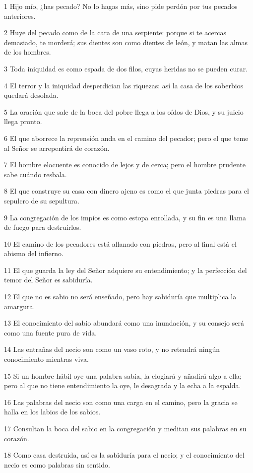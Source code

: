 \par 1 Hijo mío, ¿has pecado? No lo hagas más, sino pide perdón por tus pecados anteriores.
\par 2 Huye del pecado como de la cara de una serpiente: porque si te acercas demasiado, te morderá; sus dientes son como dientes de león, y matan las almas de los hombres.
\par 3 Toda iniquidad es como espada de dos filos, cuyas heridas no se pueden curar.
\par 4 El terror y la iniquidad desperdician las riquezas: así la casa de los soberbios quedará desolada.
\par 5 La oración que sale de la boca del pobre llega a los oídos de Dios, y su juicio llega pronto.
\par 6 El que aborrece la reprensión anda en el camino del pecador; pero el que teme al Señor se arrepentirá de corazón.
\par 7 El hombre elocuente es conocido de lejos y de cerca; pero el hombre prudente sabe cuándo resbala.
\par 8 El que construye su casa con dinero ajeno es como el que junta piedras para el sepulcro de su sepultura.
\par 9 La congregación de los impíos es como estopa enrollada, y su fin es una llama de fuego para destruirlos.
\par 10 El camino de los pecadores está allanado con piedras, pero al final está el abismo del infierno.
\par 11 El que guarda la ley del Señor adquiere su entendimiento; y la perfección del temor del Señor es sabiduría.
\par 12 El que no es sabio no será enseñado, pero hay sabiduría que multiplica la amargura.
\par 13 El conocimiento del sabio abundará como una inundación, y su consejo será como una fuente pura de vida.
\par 14 Las entrañas del necio son como un vaso roto, y no retendrá ningún conocimiento mientras viva.
\par 15 Si un hombre hábil oye una palabra sabia, la elogiará y añadirá algo a ella; pero al que no tiene entendimiento la oye, le desagrada y la echa a la espalda.
\par 16 Las palabras del necio son como una carga en el camino, pero la gracia se halla en los labios de los sabios.
\par 17 Consultan la boca del sabio en la congregación y meditan sus palabras en su corazón.
\par 18 Como casa destruida, así es la sabiduría para el necio; y el conocimiento del necio es como palabras sin sentido.
